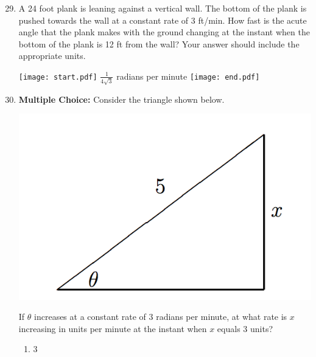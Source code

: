 \documentclass[12pt]{article}
\begin{document}

\begin{enumerate}
\setcounter{enumi}{28}

\item A 24 foot plank is leaning against a vertical wall.  The bottom of the plank is pushed towards the wall at a constant rate of 3 ft/min.  How fast is the acute angle that the plank makes with the ground changing at the instant when the bottom of the plank is 12 ft from the wall?  Your answer should include the appropriate units.

\texttt{[image: start.pdf]}
{{$\frac{1}{4\sqrt{3}}$ radians per minute}}
\texttt{[image: end.pdf]}


\item {\bf Multiple Choice:} Consider the triangle shown below.
\begin{center}
\includegraphics[scale=0.5]{triangle.png}
\end{center}
If $\theta$ increases at a constant rate of 3 radians per minute, at what rate is $x$ increasing in units per minute at the instant when $x$ equals 3 units?

\begin{enumerate}

\item 3


\end{enumerate}
\end{enumerate}
\end{document}

